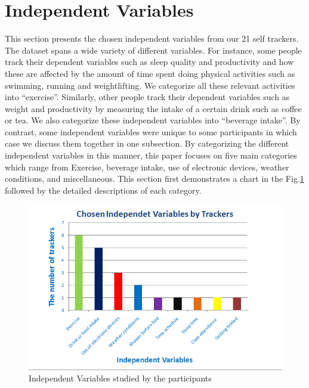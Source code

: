 \section{Independent Variables}

This section presents the chosen independent variables from our 21 self trackers. The dataset spans a wide variety of different variables. For instance, some people track their dependent variables such as sleep quality and productivity and how these are affected by the amount of time spent doing physical activities such as swimming, running and weightlifting. We categorize all these relevant activities into “exercise”. Similarly, other people track their dependent variables such as weight and productivity by measuring the intake of a certain drink such as coffee or tea. We also categorize these independent variables into “beverage intake”. By contrast, some independent variables were unique to some participants in which case we discuss them together in one subsection. By categorizing the different independent variables in this manner, this paper focuses on five main categories which range from Exercise, beverage intake, use of electronic devices, weather conditions, and miscellaneous. This section first demonstrates a chart in the Fig.\ref{fig:chart} followed by the detailed descriptions of each category. 

\begin{figure}[!t]\centering
\includegraphics[width=1.0\columnwidth]{images/independent_variables.jpg}
\caption{\footnotesize Independent Variables studied by the participants \label{fig:chart} 
}%
\end{figure}

